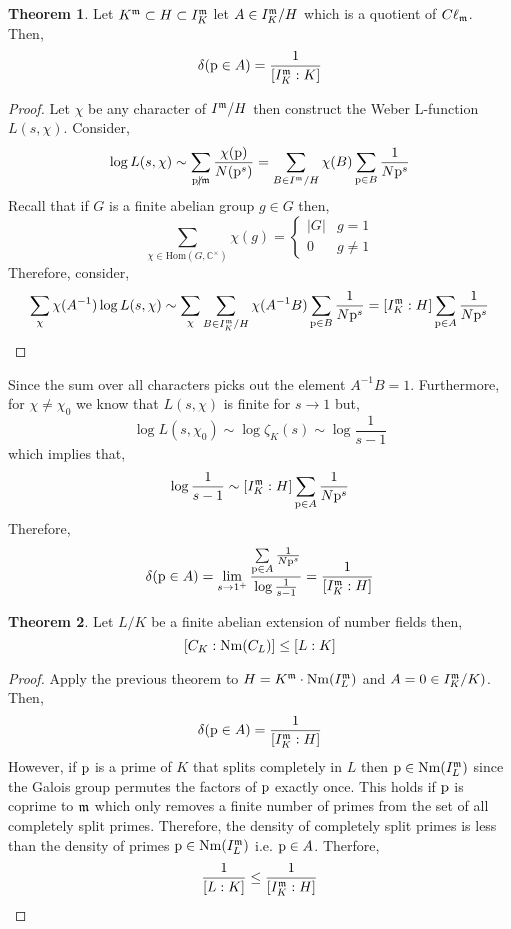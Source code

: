 \documentclass[12pt]{extarticle}
\newcommand{\ndivides}{\centernot \mid}
\newcommand{\C}{\mathbb{C}}
\newcommand{\Hom}[2]{\mathrm{Hom}\left( #1, #2 \right)}
\theoremstyle{definition}
\newtheorem{theorem}{Theorem}[section]
\begin{document}
\begin{theorem}
Let $K^{\mathfrak{m}} \subset H \subset I_K^{\mathfrak{m}}$ let $A \in I_K^{\mathfrak{m}} / H$ which is a quotient of $C\ell_{\mathfrak{m}}$. Then,
\[ \delta(\mathrm{p} \in A) = \frac{1}{[I_K^{\mathfrak{m}} : K]} \]
\begin{proof}
Let $\chi$ be any character of $I^{\mathfrak{m}} / H$ then construct the Weber L-function $L(s, \chi)$. Consider,
\[ \log{L(s, \chi)} \sim \sum_{\p \ndivides \m} \frac{\chi(\p)}{N(\p^s)} = \sum_{B \in I^\m/H} \chi(B) \sum_{\p \in B} \frac{1}{N \p^s} \]
Recall that if $G$ is a finite abelian group $g \in G$ then,
\[ \sum_{\chi \in \Hom{G}{\C^\times}} \chi(g) = \begin{cases}
|G| & g = 1 
\\
0 & g \neq 1
\end{cases} \]
Therefore, consider,
\begin{align*}
\sum_{\chi} \chi(A^{-1}) \log{L(s, \chi)} \sim \sum_{\chi} \sum_{B \in I^{\mathfrak{m}}_K/H} \chi(A^{-1} B) \sum_{\mathrm{p} \in B} \frac{1}{N \mathrm{p}^s} = [I_K^{\mathfrak{m}} : H] \sum_{\mathrm{p} \in A} \frac{1}{N \mathrm{p}^s} 
\end{align*}
\end{proof}
Since the sum over all characters picks out the element $A^{-1} B = 1$. Furthermore, for $\chi \neq \chi_0$ we know that $L(s, \chi)$ is finite for $s \to 1$ but,
\[ \log{L(s, \chi_0)} \sim \log{\zeta_K(s)} \sim \log{\frac{1}{s-1}} \]
which implies that,
\[ \log{\frac{1}{s-1}} \sim [I_K^{\mathfrak{m}} : H] \sum_{\mathrm{p} \in A} \frac{1}{N \mathrm{p}^s}  \]
Therefore,
\begin{align*}
\delta(\mathrm{p} \in A) = \lim_{s \to 1^+} \frac{\sum\limits_{\mathrm{p} \in A} \frac{1}{N \mathrm{p}^s}}{\log{\frac{1}{s-1}}} = \frac{1}{[I_K^{\mathfrak{m}} : H]} 
\end{align*}
\end{theorem}


\begin{theorem}
Let $L / K$ be a finite abelian extension of number fields then,
\[ [C_K : \mathrm{Nm}(C_L)] \le [ L : K ] \]
\end{theorem}

\begin{proof}
Apply the previous theorem to $H = K^{\mathfrak{m}} \cdot \mathrm{Nm}(I^{\mathfrak{m}}_L)$ and $A = 0 \in I_K^{\mathfrak{m}}  / K)$. Then,
\[ \delta(\mathrm{p} \in A) = \frac{1}{[I_K^{\mathfrak{m}} : H]} \]
However, if $\mathrm{p}$ is a prime of $K$ that splits completely in $L$ then $\mathrm{p} \in \mathrm{Nm}(I^{\mathfrak{m}}_L)$ since the Galois group permutes the factors of $\mathrm{p}$ exactly once. This holds if $\mathrm{p}$ is coprime to $\mathfrak{m}$ which only removes a finite number of primes from the set of all completely split primes. Therefore, the density of completely split primes is less than the density of primes $\mathrm{p} \in \mathrm{Nm}(I^{\mathfrak{m}}_L)$ i.e. $\mathrm{p} \in A$. Therfore,
\[ \frac{1}{[L : K]} \le \frac{1}{[I^{\mathfrak{m}}_K : H]} \] 
\end{proof}
\end{document}
